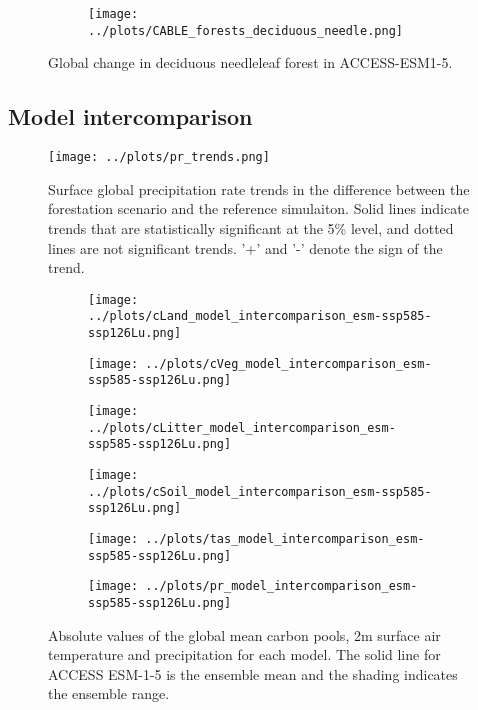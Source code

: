 \documentclass[]{article}
\begin{document}
\begin{figure}[H]
    \centering
    \begin{subfigure}[b]{0.45\linewidth}
        \texttt{[image: ../plots/CABLE\_forests\_deciduous\_needle.png]}
    \end{subfigure}
    \caption{Global change in deciduous needleleaf forest in ACCESS-ESM1-5.}
    \label{fig:ACCESS_dec_needle_cover}
\end{figure}

\subsection{Model intercomparison}

\begin{figure}[H]
    \centering
    \texttt{[image: ../plots/pr\_trends.png]}
    \caption{Surface global precipitation rate trends in the difference between the forestation scenario and the reference simulaiton. Solid lines indicate trends that are statistically significant at the 5\% level, and dotted lines are not significant trends. '+' and '-' denote the sign of the trend.}
    \label{fig:models_pr_trends}
\end{figure}

\begin{figure}[H]
    \centering
    \begin{subfigure}[b]{0.45\linewidth}
        \texttt{[image: ../plots/cLand\_model\_intercomparison\_esm-ssp585-ssp126Lu.png]}
    \end{subfigure}
    \begin{subfigure}[b]{0.45\linewidth}
        \texttt{[image: ../plots/cVeg\_model\_intercomparison\_esm-ssp585-ssp126Lu.png]}
    \end{subfigure}
    \begin{subfigure}[b]{0.45\linewidth}
        \texttt{[image: ../plots/cLitter\_model\_intercomparison\_esm-ssp585-ssp126Lu.png]}
    \end{subfigure}
    \begin{subfigure}[b]{0.45\linewidth}
        \texttt{[image: ../plots/cSoil\_model\_intercomparison\_esm-ssp585-ssp126Lu.png]}
    \end{subfigure}
    \begin{subfigure}[b]{0.45\linewidth}
        \texttt{[image: ../plots/tas\_model\_intercomparison\_esm-ssp585-ssp126Lu.png]}
    \end{subfigure}
    \begin{subfigure}[b]{0.45\linewidth}
        \texttt{[image: ../plots/pr\_model\_intercomparison\_esm-ssp585-ssp126Lu.png]}
    \end{subfigure}
    \caption{Absolute values of the global mean carbon pools, 2m surface air temperature and precipitation for each model. The solid line for ACCESS ESM-1-5 is the ensemble mean and the shading indicates the ensemble range.}
    \label{fig:models_absolute}
\end{figure}
\end{document}
